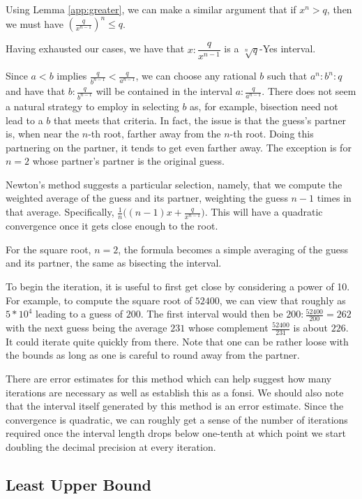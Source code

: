 \documentclass[12pt]{article}
\begin{document}
Using Lemma \ref{app:greater}, we can make a similar argument that if $x^n > q$, then we must have $(\frac{q}{x^{n-1}})^n \leq q$. 

Having exhausted our cases, we have that $x:\dfrac{q}{x^{n-1}}$ is a $\sqrt[n]{q}$-Yes interval.

Since $a<b$ implies $\frac{q}{b^{n-1}} < \frac{q}{a^{n-1}}$, we can choose any rational $b$ such that $a^n:b^n:q$ and have that $b:\frac{q}{b^{n-1}}$ will be contained in the interval $a:\frac{q}{a^{n-1}}$. There does not seem a natural strategy to employ in selecting $b$ as, for example, bisection need not lead to a $b$ that meets that criteria. In fact, the issue is that the guess's partner is, when near the $n$-th root, farther away from the $n$-th root. Doing this partnering on the partner, it tends to get even farther away. The exception is for $n=2$ whose partner's partner is the original guess. 

Newton's method suggests a particular selection, namely, that we compute the weighted average of the guess and its partner, weighting the guess $n-1$ times in that average. Specifically, $\frac{1}{n} \big( (n-1) x + \frac{q}{x^{n-1}} \big)$. This will have a quadratic convergence once it gets close enough to the root.

For the square root, $n=2$, the formula becomes a simple averaging of the guess and its partner, the same as bisecting the interval.  

To begin the iteration, it is useful to first get close by considering a power of 10. For example, to compute the square root of $52400$, we can view that roughly as $5*10^4$ leading to a guess of $200$. The first interval would then be $200: \frac{52400}{200} = 262$ with the next guess being the average $231$ whose complement $\frac{52400}{231}$ is about $226$. It could iterate quite quickly from there. Note that one can be rather loose with the bounds as long as one is careful to round away from the partner.  

There are error estimates for this method which can help suggest how many iterations are necessary as well as establish this as a fonsi. We should also note that the interval itself generated by this method is an error estimate. Since the convergence is quadratic, we can roughly get a sense of the number of iterations required once the interval length drops below one-tenth at which point we start doubling the decimal precision at every iteration.  


\subsection{Least Upper Bound}\label{sec:lub}
\end{document}
